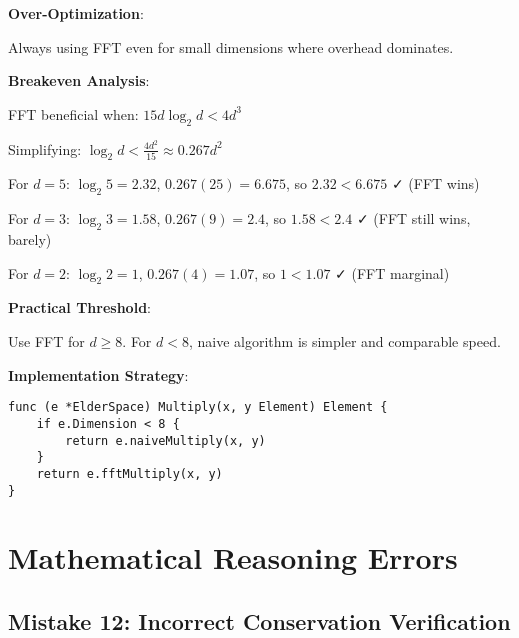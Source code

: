 \begin{warning}
\textbf{Over-Optimization}:

Always using FFT even for small dimensions where overhead dominates.

\textbf{Breakeven Analysis}:

FFT beneficial when: $15d \log_2 d < 4d^3$

Simplifying: $\log_2 d < \frac{4d^2}{15} \approx 0.267d^2$

For $d=5$: $\log_2 5 = 2.32$, $0.267(25) = 6.675$, so $2.32 < 6.675$ ✓ (FFT wins)

For $d=3$: $\log_2 3 = 1.58$, $0.267(9) = 2.4$, so $1.58 < 2.4$ ✓ (FFT still wins, barely)

For $d=2$: $\log_2 2 = 1$, $0.267(4) = 1.07$, so $1 < 1.07$ ✓ (FFT marginal)

\textbf{Practical Threshold}:

Use FFT for $d \geq 8$. For $d < 8$, naive algorithm is simpler and comparable speed.

\textbf{Implementation Strategy}:

\begin{lstlisting}[style=golang]
func (e *ElderSpace) Multiply(x, y Element) Element {
    if e.Dimension < 8 {
        return e.naiveMultiply(x, y)
    }
    return e.fftMultiply(x, y)
}
\end{lstlisting}
\end{warning}

\section{Mathematical Reasoning Errors}

\subsection{Mistake 12: Incorrect Conservation Verification}

